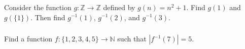 \documentclass[11pt, compress]{beamer}
\newcommand{\N}{\mathbb N}
\newcommand{\Z}{\mathbb Z}
\newcommand{\inv}{^{-1}}
\newcommand{\card}[1]{\left| #1 \right|}
\begin{document}
\begin{frame}
\frametitle{}
\begin{example}[0.4.9]Consider the function \(g:\Z \to \Z\) defined by \(g(n) = n^2 + 1\). Find \(g(1)\) and \(g(\{1\})\). Then find \(g\inv(1)\), \(g\inv(2)\), and \(g\inv(3)\).
\end{example}
\end{frame}
 
\begin{frame}
\frametitle{}
\begin{example}[0.4.10]Find a function \(f:\{1,2,3,4,5\} \to \N\) such that \(\card{f\inv(7)} = 5\).
\end{example}
\end{frame}
 
\end{document}

